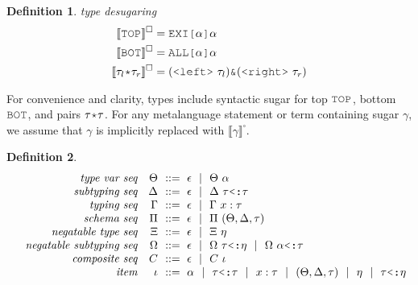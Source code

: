 \documentclass[acmsmall]{acmart}
\theoremstyle{definition}
\newtheorem{definition}{Definition}[section]
\begin{document}
\begin{definition} 
  \label{def:type_desugaring}
  \emph{type desugaring}
  \hfill 
  \small
  \boxed{\llbracket \gamma \rrbracket^\square = \tau}
  \\
  \begin{align*}
    \llbracket \J{TOP} \rrbracket^\square &= \J{EXI[} \alpha \J{]} \alpha
    \\
    \llbracket \J{BOT} \rrbracket^\square &= \J{ALL[} \alpha \J{]} \alpha
    \\
    \llbracket \tau_l \J{*} \tau_r \rrbracket^\square &= (\J{<left>}\ \tau_l)  \J{\&} (\J{<right>}\ \tau_r)
  \end{align*}
\end{definition} 

\noindent
For convenience and clarity, types include syntactic sugar for top $\J{TOP}$, 
bottom $\J{BOT}$, and pairs $\tau \J{*} \tau$.
For any metalanguage statement or term containing sugar $\gamma$, we assume that $\gamma$ is implicitly replaced with $\llbracket \gamma \rrbracket^\square$.


\begin{definition}
  \label{def:sequence}
  \[\begin{array}[t]{rr@{}l}
    \com{type var seq} &
    \nonterm{\Theta} & \is \epsilon \sep \Theta\ \alpha 
    \\
    \com{subtyping seq} &
    \nonterm{\Delta} & \is \epsilon \sep \Delta \  \tau \J{<:} \tau
    \\
    \com{typing seq} &
    \nonterm{\Gamma} & \is \epsilon \sep \Gamma\ x \hastype \tau
    \\
    \com{schema seq} &
    \nonterm{\Pi} & \is \epsilon \sep \Pi\ (\Theta, \Delta, \tau) 
    \\
    \com{negatable type seq} &
    \nonterm{\Xi} & \is \epsilon \sep \Xi\ \eta 
    \\
    \com{negatable subtyping seq} &
    \nonterm{\Omega} & \is \epsilon \sep 
      \Omega\ \tau \J{<:} \eta \sep 
      \Omega\ \alpha \J{<:} \tau
    \\
    \com{composite seq} &
    \nonterm{C} & \is \epsilon \sep C\ \iota 
    \\
    \com{item} &
    \nonterm{\iota} & \is 
    \alpha
    \sep 
    \tau \J{<:} \tau
    \sep
    x \hastype \tau
    \sep
    (\Theta, \Delta, \tau)
    \sep
    \eta
    \sep
    \tau \J{<:} \eta

  \end{array}\]
\end{definition}
\end{document}
